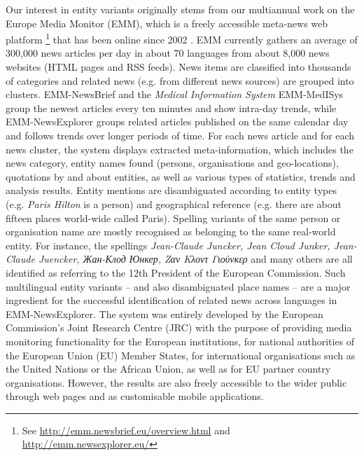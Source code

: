 \documentclass[output=paper]{langsci/langscibook}
\begin{document}
Our interest in entity variants originally stems from our multiannual work on the Europe Media Monitor (EMM), which is a freely accessible meta-news web platform \footnote{See \url{http://emm.newsbrief.eu/overview.html} and \url{http://emm.newsexplorer.eu/}} that has been online since 2002 \citep{steinberger-09,steinberger-15}. EMM currently gathers an average of 300,000 news articles per day in about 70 languages from about 8,000 news websites (HTML pages and RSS feeds). News items are classified into thousands of categories 
 and related news (e.g. from different news sources) are grouped into clusters. EMM-NewsBrief and the \textit{Medical Information System} EMM-MedISys group the newest articles every ten minutes and show intra-day trends, while EMM-NewsExplorer groups related articles published on the same calendar day and follows trends over longer periods of time. For each news article and for each news cluster, the system displays extracted meta-information, which includes the news category, entity names found (persons, organisations and geo-locations), quotations by and about entities, as well as various types of statistics, trends and analysis results. Entity mentions are disambiguated according to entity types (e.g. \textit{Paris Hilton} is a person) and geographical reference (e.g. there are about fifteen places world-wide called Paris). Spelling variants of the same person or organisation name are mostly recognised as belonging to the same real-world entity. For instance, the spellings \textit{Jean-Claude Juncker, Jean Cloud Junker, Jean-Claude Juencker, Жан-Клод Юнкер, Ζαν Κλοντ Γιούνκερ} %
and many others are all identified as referring to the 12th President of the European Commission. Such multilingual entity variants – and also disambiguated place names – are a major ingredient for the successful identification of related news across languages in EMM-NewsExplorer. The system was entirely developed by the European Commission’s Joint Research Centre (JRC) with the purpose of providing media monitoring functionality for the European institutions, for national authorities of the European Union (EU) Member States, for international organisations such as the United Nations or the African Union, as well as for EU partner country organisations. However, the results are also freely accessible to the wider public through web pages and as customisable mobile applications.
\end{document}
